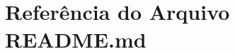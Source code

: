 \hypertarget{README_8md}{\section{Referência do Arquivo R\-E\-A\-D\-M\-E.\-md}
\label{README_8md}
}
